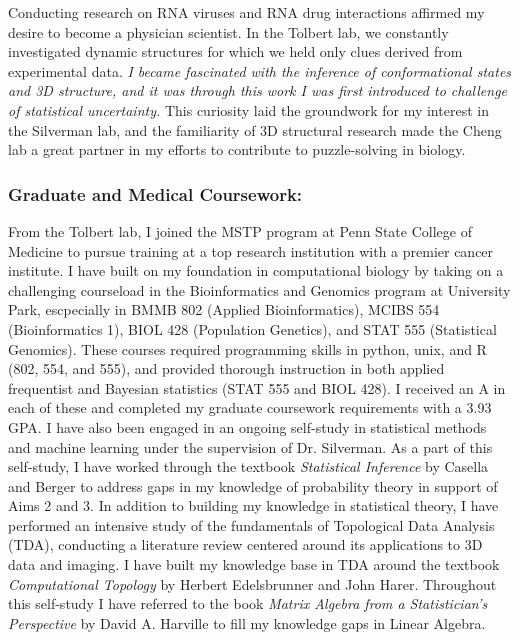 \documentclass{NIHGrant}
\begin{document}
Conducting research on RNA viruses and RNA drug interactions affirmed my desire to become a physician scientist. In the Tolbert lab, we constantly investigated dynamic structures for which we held only clues derived from experimental data. \emph{I became fascinated with the inference of conformational states and 3D structure, and it was through this work I was first introduced to challenge of statistical uncertainty.} This curiosity laid the groundwork for my interest in the Silverman lab, and the familiarity of 3D structural research made the Cheng lab a great partner in my efforts to contribute to puzzle-solving in biology.

\subsubsection*{Graduate and Medical Coursework:}
From the Tolbert lab, I joined the MSTP program at Penn State College of Medicine to pursue training at a top research institution with a premier cancer institute. I have built on my foundation in computational biology by taking on a challenging courseload in the Bioinformatics and Genomics program at University Park, escpecially in BMMB 802 (Applied Bioinformatics), MCIBS 554 (Bioinformatics 1), BIOL 428 (Population Genetics), and STAT 555 (Statistical Genomics). These courses required programming skills in python, unix, and R (802, 554, and 555), and provided thorough instruction in both applied frequentist and Bayesian statistics (STAT 555 and BIOL 428). I received an A in each of these and completed my graduate coursework requirements with a 3.93 GPA. I have also been engaged in an ongoing self-study in statistical methods and machine learning under the supervision of Dr. Silverman. As a part of this self-study, I have worked through the textbook \textit{Statistical Inference} by Casella and Berger to address gaps in my knowledge of probability theory in support of Aims 2 and 3. In addition to building my knowledge in statistical theory, I have performed an intensive study of the fundamentals of Topological Data Analysis (TDA), conducting a literature review centered around its applications to 3D data and imaging. I have built my knowledge base in TDA around the textbook \textit{Computational Topology} by Herbert Edelsbrunner and John Harer. Throughout this self-study I have referred to the book \textit{Matrix Algebra from a Statistician's Perspective} by David A. Harville to fill my knowledge gaps in Linear Algebra.
\end{document}
